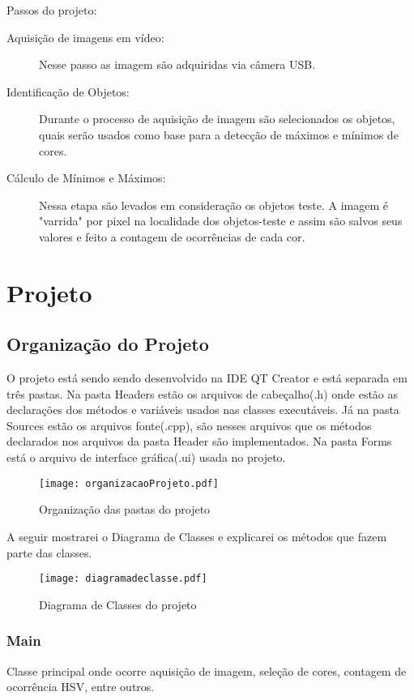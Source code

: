 	
	Passos do projeto:
	\begin{description}
		\item[Aquisição de imagens em vídeo:] Nesse passo as imagem são adquiridas via câmera USB.
		
		\item[Identificação de Objetos:]
				 Durante o processo de aquisição de imagem são selecionados os objetos, quais serão usados como base para a detecção de máximos e mínimos de cores.
		\item [Cálculo de Mínimos e Máximos:]
		 Nessa etapa são levados em consideração os objetos teste. A imagem é "varrida"  por pixel na localidade dos objetos-teste e assim são salvos seus valores e feito a contagem de ocorrências de cada cor.		
	\end{description}


	\section{Projeto}
	\subsection{Organização do Projeto}
	 O projeto está sendo sendo desenvolvido na IDE QT Creator e está separada em três pastas. Na pasta Headers estão os arquivos de cabeçalho(.h) onde estão as declarações dos métodos e variáveis usados nas classes  executáveis. Já na pasta Sources estão os arquivos fonte(.cpp), são nesses arquivos que os métodos declarados nos arquivos da pasta Header são implementados. Na pasta Forms está o arquivo de interface gráfica(.ui) usada no projeto.
	 
	\begin{figure}[!h]
		\centering
		\texttt{[image: organizacaoProjeto.pdf]}
		\caption{Organização das pastas do projeto}
		\label{Organizacao do Projeto}
	\end{figure}
	 A seguir mostrarei o Diagrama de Classes e explicarei os métodos que fazem parte das classes.
	 \begin{figure}[!h]
	 	\centering
	 	\texttt{[image: diagramadeclasse.pdf]}
	 	\caption{Diagrama de Classes do projeto}
	 	\label{Diagrama De Classe}
	 \end{figure}\newpage


	\subsubsection{Main}
	Classe principal onde ocorre aquisição de imagem, seleção de cores, contagem de ocorrência HSV, entre outros.
	

